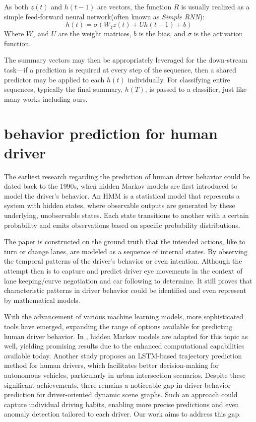     As both $z(t)$ and $h(t-1)$ are vectors, the function $R$ is usually realized as a simple feed-forward neural network(often known as \textit{Simple RNN}\cite{elman1990finding,jordan1997serial}):
    \[
        h(t) = \sigma(W_z z(t) + U h(t-1) + b)
    \]
    Where $W_z$ and $U$ are the weight matrices, $b$ is the bias, and $\sigma$ is the activation function. 

    The summary vectors may then be appropriately leveraged for the down-stream task—if a prediction is required at every step of the sequence, then a shared predictor may be applied to each $h(t)$ individually. For classifying entire sequences, typically the final summary, $h(T)$, is passed to a classifier, just like many works including ours.



    

\section{behavior prediction for human driver}

The earliest research regarding the prediction of human driver behavior could be dated back to the 1990s, when hidden Markov models are first introduced to model the driver's behavior\cite{10.1162/089976699300016890}. An HMM is a statistical model that represents a system with hidden states, where observable outputs are generated by these underlying, unobservable states. Each state transitions to another with a certain probability and emits observations based on specific probability distributions. 

The paper is constructed on the ground truth that the intended actions, like to turn or change lanes, are modeled as a sequence of internal states. By observing the temporal patterns of the driver's behavior or even intention. Although the attempt then is to capture and predict driver eye movements in the context of lane keeping/curve negotiation and car following to determine. It still proves that characteristic patterns in driver behavior could be identified and even represent by mathematical models.

With the advancement of various machine learning models, more sophisticated tools have emerged, expanding the range of options available for predicting human driver behavior. In \cite{10.1109/ivs.2018.8500717}, hidden Markov models are adapted for this topic as well, yielding promising results due to the enhanced computational capabilities available today. Another study \cite{10.1109/icra40945.2020.9196918} proposes an LSTM-based trajectory prediction method for human drivers, which facilitates better decision-making for autonomous vehicles, particularly in urban intersection scenarios. Despite these significant achievements, there remains a noticeable gap in driver behavior prediction for driver-oriented dynamic scene graphs. Such an approach could capture individual driving habits, enabling more precise predictions and even anomaly detection tailored to each driver. Our work aims to address this gap.